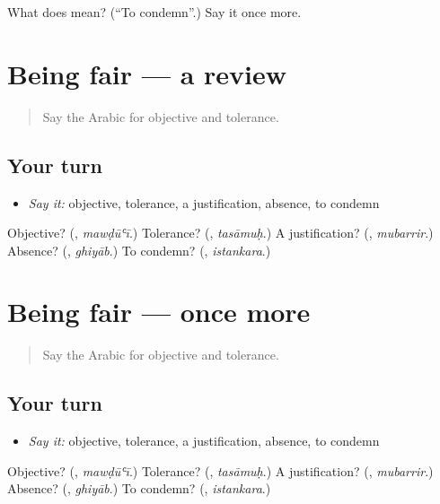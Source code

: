 \begin{tcolorbox}[breakable,colback=teal!4,colframe=teal!35!black,title={Before you move on}]
What does  mean? (\textquotedblleft{}To condemn\textquotedblright{}.) Say it once more.
\end{tcolorbox}
\section[(dialogue)]{Being fair — a review}

\label{lesson:AR-R422-review-422-422}



\begin{quote}
Say the Arabic for objective and tolerance.
\end{quote}

\subsection*{Your turn}
\begin{itemize}
\raggedright
  \item \emph{Say it:} objective, tolerance, a justification, absence, to condemn
\end{itemize}

\begin{tcolorbox}[breakable,colback=teal!4,colframe=teal!35!black,title={Before you move on}]
Objective? (\textbf{}, \emph{mawḍūʿī}.) Tolerance? (\textbf{}, \emph{tasāmuḥ}.) A justification? (\textbf{}, \emph{mubarrir}.) Absence? (\textbf{}, \emph{ghiyāb}.) To condemn? (\textbf{}, \emph{istankara}.)
\end{tcolorbox}
\section[(dialogue)]{Being fair — once more}

\label{lesson:AR-R422-review-final-422}



\begin{quote}
Say the Arabic for objective and tolerance.
\end{quote}

\subsection*{Your turn}
\begin{itemize}
\raggedright
  \item \emph{Say it:} objective, tolerance, a justification, absence, to condemn
\end{itemize}

\begin{tcolorbox}[breakable,colback=teal!4,colframe=teal!35!black,title={Before you move on}]
Objective? (\textbf{}, \emph{mawḍūʿī}.) Tolerance? (\textbf{}, \emph{tasāmuḥ}.) A justification? (\textbf{}, \emph{mubarrir}.) Absence? (\textbf{}, \emph{ghiyāb}.) To condemn? (\textbf{}, \emph{istankara}.)
\end{tcolorbox}
